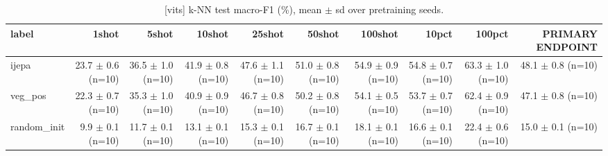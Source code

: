 \begin{table}[t]
\centering
\small
\caption{[vits] k-NN test macro-F1 (\%), mean $\pm$ sd over pretraining seeds.}
\label{tab:main_results_knn}
\begin{tabular}{lrrrrrrrrr}
\toprule
label & 1shot & 5shot & 10shot & 25shot & 50shot & 100shot & 10pct & 100pct & PRIMARY ENDPOINT \\
\midrule
ijepa & 23.7 $\pm$ 0.6 (n=10) & 36.5 $\pm$ 1.0 (n=10) & 41.9 $\pm$ 0.8 (n=10) & 47.6 $\pm$ 1.1 (n=10) & 51.0 $\pm$ 0.8 (n=10) & 54.9 $\pm$ 0.9 (n=10) & 54.8 $\pm$ 0.7 (n=10) & 63.3 $\pm$ 1.0 (n=10) & 48.1 $\pm$ 0.8 (n=10) \\
veg\_pos & 22.3 $\pm$ 0.7 (n=10) & 35.3 $\pm$ 1.0 (n=10) & 40.9 $\pm$ 0.9 (n=10) & 46.7 $\pm$ 0.8 (n=10) & 50.2 $\pm$ 0.8 (n=10) & 54.1 $\pm$ 0.5 (n=10) & 53.7 $\pm$ 0.7 (n=10) & 62.4 $\pm$ 0.9 (n=10) & 47.1 $\pm$ 0.8 (n=10) \\
random\_init & 9.9 $\pm$ 0.1 (n=10) & 11.7 $\pm$ 0.1 (n=10) & 13.1 $\pm$ 0.1 (n=10) & 15.3 $\pm$ 0.1 (n=10) & 16.7 $\pm$ 0.1 (n=10) & 18.1 $\pm$ 0.1 (n=10) & 16.6 $\pm$ 0.1 (n=10) & 22.4 $\pm$ 0.6 (n=10) & 15.0 $\pm$ 0.1 (n=10) \\
\bottomrule
\end{tabular}
\end{table}

